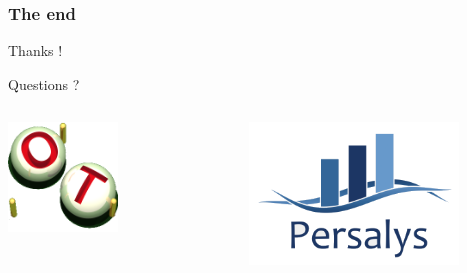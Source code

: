 \documentclass{beamer}
\begin{document}

\begin{frame}
\frametitle{The end}

\begin{center}
Thanks !
\end{center}

\begin{center}
Questions ?
\end{center}

\begin{columns}
\centering
\includegraphics[width=0.5\textwidth]{figures/logo-openturns.png}

\includegraphics[width=0.8\textwidth]{figures/PERSALYS-LOGO.png}

\end{columns}

\end{frame}
  
\end{document}

